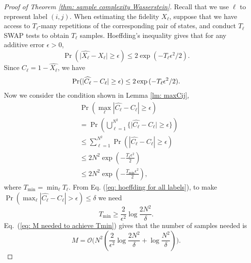 \documentclass[aps,prx,reprint,superscriptaddress,amsmath,amssymb,longbibliography,floatfix]{revtex4-2}
\newcommand{\abs}[1]{\lvert #1\rvert}
\newcommand{\Abs}[1]{\left\lvert #1\right\rvert}
\newcommand{\scO}{\mathcal{O}}
\newcommand{\PL}[1]{{\textcolor{green}{#1}}}
\theoremstyle{plain}
\theoremstyle{definition}
\theoremstyle{remark}
\begin{document}
\begin{proof}[Proof of Theorem \ref{thm: sample complexity Wasserstein}]
Recall that we use $\ell$ to represent label $(i,j)$. When estimating the fidelity $X_{\ell}$, suppose that we have access to $T_{\ell}$-many repetitions of the corresponding pair of states, and conduct $T_{\ell}$ SWAP tests to obtain $T_{\ell}$ samples. Hoeffding's inequality gives that for any additive error $\epsilon>0$,
\begin{equation}\label{eq:app-local-swap-hoeffding-bound}
    \Pr(\abs{\widehat{X_{\ell}}-X_{\ell}}\geq \epsilon) \le 2 \exp{(-T_{\ell}\epsilon^2/2)}.
\end{equation}
Since $\widehat{C_{\ell}} = 1-\widehat{X_{\ell}}$, we have
\begin{equation}
    \Pr(\abs{\widehat{C_{\ell}}-C_{\ell}}\ge \epsilon) \leq 2 \exp{(-T_{\ell}\epsilon^2/2)}.
    \label{eq: HoeffdingC_{ell}}
\end{equation}
Now we consider the condition shown in Lemma \ref{lm: maxCij},
\begin{align}
\label{eq: hoeffding for all labels}
&
    \Pr \left( \max_{\ell} \Abs{\widehat{C_{\ell}}-C_{\ell}}\ge\epsilon \right) \nonumber\\
    &= \Pr\left( \bigcup_{\ell=1}^{N^2} \{\abs{\widehat{C_{\ell}}-C_{\ell}} \ge \epsilon \} \right)\nonumber\\
    &\le \sum_{\ell=1}^{N^2} \Pr\left( \Abs{\widehat{C_{\ell}}-C_{\ell}} \ge \epsilon \right) \nonumber \\ 
    &\leq 2N^2 \exp{ \left( -\frac{T_{\ell}\epsilon^2}{2} \right)} \nonumber\\
    &\leq 2N^2\exp{ \left( -\frac{T_{\min}\epsilon^2}{2} \right)},
\end{align}
where $T_{\min} = \min_{\ell} T_{\ell}$. 
From Eq. (\ref{eq: hoeffding for all labels}), to make $\Pr \left( \max_{\ell} \Abs{\widehat{C_{\ell}}-C_{\ell}}>\epsilon \right) \leq \delta$ we need \begin{equation}T_{\min} \ge \frac{2}{\epsilon^2}\log{\frac{2N^2}{\delta}}.
\label{eq:app-wasserstein-minimum-pair-count}
\end{equation} Eq.~(\ref{eq: M needed to achieve Tmin}) gives that the number of samples needed is \begin{equation}M=\scO\Big( N^2(\frac{2}{\epsilon^2}\log{\frac{2N^2}{\delta}}+\log\frac{N^2}{\delta}) \Big).
\label{eq:app-wasserstein-local-total-samples}
\end{equation} %




\end{proof}
\end{document}
